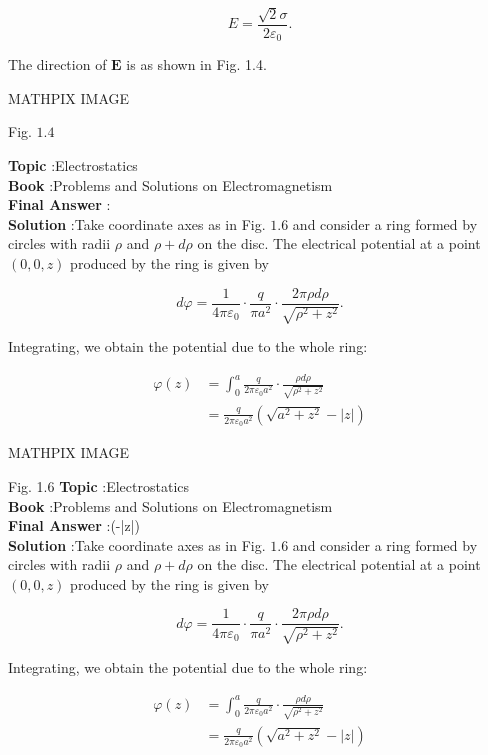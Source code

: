 \documentclass[10pt]{article}
\begin{document}
$$
E=\frac{\sqrt{2} \sigma}{2 \varepsilon_{0}} .
$$

The direction of $\mathbf{E}$ is as shown in Fig. 1.4.

MATHPIX IMAGE

Fig. $1.4$ 

\textbf{Topic} :Electrostatics\\
\textbf{Book} :Problems and Solutions on Electromagnetism\\
\textbf{Final Answer} :\\


\textbf{Solution} :Take coordinate axes as in Fig. $1.6$ and consider a ring formed by circles with radii $\rho$ and $\rho+d \rho$ on the disc. The electrical potential at a point $(0,0, z)$ produced by the ring is given by

$$
d \varphi=\frac{1}{4 \pi \varepsilon_{0}} \cdot \frac{q}{\pi a^{2}} \cdot \frac{2 \pi \rho d \rho}{\sqrt{\rho^{2}+z^{2}}} .
$$

Integrating, we obtain the potential due to the whole ring:

$$
\begin{aligned}
\varphi(z) &=\int_{0}^{a} \frac{q}{2 \pi \varepsilon_{0} a^{2}} \cdot \frac{\rho d \rho}{\sqrt{\rho^{2}+z^{2}}} \\
&=\frac{q}{2 \pi \varepsilon_{0} a^{2}}\left(\sqrt{a^{2}+z^{2}}-|z|\right)
\end{aligned}
$$

MATHPIX IMAGE

Fig. 1.6
\textbf{Topic} :Electrostatics\\
\textbf{Book} :Problems and Solutions on Electromagnetism\\
\textbf{Final Answer} :\left(-|z|\right)\\


\textbf{Solution} :Take coordinate axes as in Fig. $1.6$ and consider a ring formed by circles with radii $\rho$ and $\rho+d \rho$ on the disc. The electrical potential at a point $(0,0, z)$ produced by the ring is given by

$$
d \varphi=\frac{1}{4 \pi \varepsilon_{0}} \cdot \frac{q}{\pi a^{2}} \cdot \frac{2 \pi \rho d \rho}{\sqrt{\rho^{2}+z^{2}}} .
$$

Integrating, we obtain the potential due to the whole ring:

$$
\begin{aligned}
\varphi(z) &=\int_{0}^{a} \frac{q}{2 \pi \varepsilon_{0} a^{2}} \cdot \frac{\rho d \rho}{\sqrt{\rho^{2}+z^{2}}} \\
&=\frac{q}{2 \pi \varepsilon_{0} a^{2}}\left(\sqrt{a^{2}+z^{2}}-|z|\right)
\end{aligned}
$$
\end{document}
